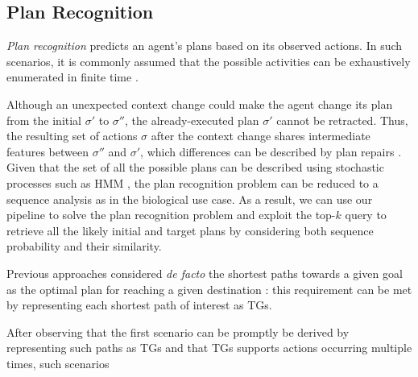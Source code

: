 
\subsection{Plan Recognition}
\textit{Plan recognition} predicts an agent's plans based on its observed actions. In such scenarios, it is commonly assumed that the possible activities can be exhaustively enumerated in finite time \cite{RamirezG09}. 

Although  an unexpected context change could make the agent change its plan from the initial $\sigma'$ to $\sigma''$, the already-executed plan $\sigma'$ cannot be retracted. Thus, the  resulting set of actions ${\sigma}$ after the context change  shares intermediate features between $\sigma''$ and $\sigma'$, which differences can be described by plan repairs \cite{FoxGLS06}. Given that the set of all the possible plans can be described using stochastic processes such as HMM \cite{LI2020101974}, the plan recognition problem can be reduced to a sequence analysis as in the biological use case. As a result, we can use our pipeline to solve the plan recognition problem and exploit the top-$k$ query to retrieve all the likely initial and target plans by considering both sequence probability and their similarity.

Previous approaches considered \textit{de facto} the shortest paths towards a given goal as the optimal plan for reaching a given destination  \cite{RamirezG10}: this requirement can be met by representing each shortest path of interest as TGs. 


 After observing that the first scenario can be promptly be derived by representing such paths as TGs and that TGs supports actions occurring multiple times, such scenarios